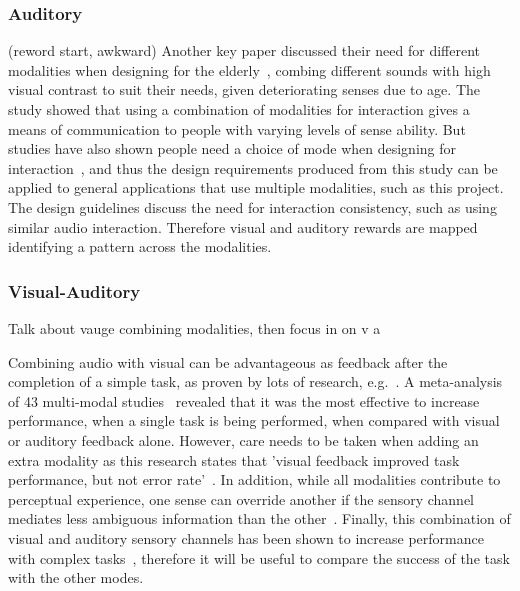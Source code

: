 \documentclass{scaffold/sigchi}
\begin{document}
\subsubsection{Auditory}
(reword start, awkward)
Another key paper discussed their need for different modalities when designing for the elderly~\cite{article_movipill_improving_medication_elders},
combing different sounds with high visual contrast to suit their needs, given deteriorating senses due to age.
The study showed that using a combination of modalities for interaction gives a means of communication to people with varying levels of sense ability.
But studies have also shown people need a choice of mode when designing for interaction~\cite{article_user_centred_multimodal_reminders},
and thus the design requirements produced from this study can be applied to general applications that use multiple modalities, such as this project.
The design guidelines discuss the need for interaction consistency, such as using similar audio interaction.
Therefore visual and auditory rewards are mapped identifying a pattern across the modalities.

\subsubsection{Visual-Auditory}
Talk about vauge combining modalities, then focus in on v a

Combining audio with visual can be advantageous as feedback after the completion of a simple task, as proven by lots of research, e.g.~\cite{benefits_of_audio_visual_1, benefits_of_audio_visual_2}. A meta-analysis of 43 multi-modal studies~\cite{comparing_modalities_effects_of_visual_auditory} revealed that it was the most effective to increase performance, when a single task is being performed, when compared with visual or auditory feedback alone. However, care needs to be taken when adding an extra modality as this research states that 'visual feedback improved task performance, but not error rate'~\cite{comparing_modalities_effects_of_visual_auditory}. In addition, while all modalities contribute to perceptual experience, one sense can override another if the sensory channel mediates less ambiguous information than the other~\cite{one_mode_override_another}. Finally, this combination of visual and auditory sensory channels has been shown to increase performance with complex tasks~\cite{chi_oussama_tap_the_shapetones}, therefore it will be useful to compare the success of the task with the other modes.
\end{document}
